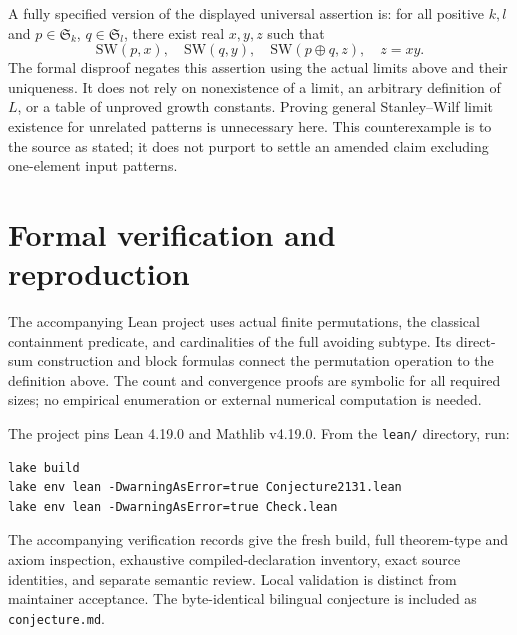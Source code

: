 \documentclass[10pt]{article}
\newcommand{\Sym}{\mathfrak S}
\begin{document}
A fully specified version of the displayed universal assertion is: for all
positive $k,l$ and $p\in\Sym_k$, $q\in\Sym_l$, there exist real $x,y,z$ such that
\[
 \mathrm{SW}(p,x),\quad \mathrm{SW}(q,y),\quad
 \mathrm{SW}(p\oplus q,z),\quad z=xy.
\]
The formal disproof negates this assertion using the actual limits above and
their uniqueness. It does not rely on nonexistence of a limit, an arbitrary
definition of $L$, or a table of unproved growth constants. Proving general
Stanley--Wilf limit existence for unrelated patterns is unnecessary here.
This counterexample is to the source as stated; it does not purport to settle
an amended claim excluding one-element input patterns.

\section{Formal verification and reproduction}
The accompanying Lean project uses actual finite permutations, the classical
containment predicate, and cardinalities of the full avoiding subtype. Its
direct-sum construction and block formulas connect the permutation operation
to the definition above. The count and convergence proofs are symbolic for all
required sizes; no empirical enumeration or external numerical computation is
needed.

The project pins Lean 4.19.0 and Mathlib v4.19.0. From the \texttt{lean/}
directory, run:
\begin{verbatim}
lake build
lake env lean -DwarningAsError=true Conjecture2131.lean
lake env lean -DwarningAsError=true Check.lean
\end{verbatim}
The accompanying verification records give the fresh build, full theorem-type
and axiom inspection, exhaustive compiled-declaration inventory, exact source
identities, and separate semantic review. Local validation is distinct from
maintainer acceptance. The byte-identical bilingual conjecture is included as
\texttt{conjecture.md}.
\end{document}
